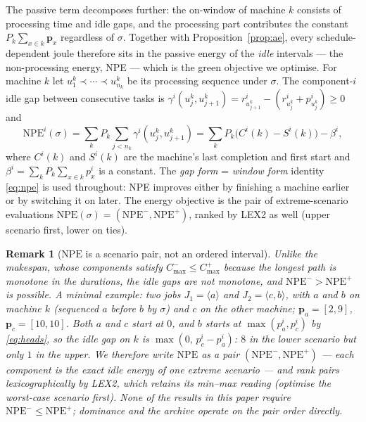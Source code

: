 \documentclass[preprint,12pt]{elsarticle}
\newtheorem{remark}{Remark}
\newcommand{\NPE}{\mathrm{NPE}}
\begin{document}
The passive term decomposes further: the on-window of machine $k$ consists
of processing time and idle gaps, and the processing part contributes the
constant $P_k\sum_{x\in k}\mathbf{p}_x$ regardless of $\sigma$. Together
with Proposition~\ref{prop:ae}, every schedule-dependent joule therefore
sits in the passive energy of the \emph{idle} intervals --- the
non-processing energy, NPE --- which is the green objective we optimise.
For machine $k$
let $u^k_1\prec\cdots\prec u^k_{n_k}$ be its processing sequence under
$\sigma$. The component-$i$ idle gap between consecutive tasks is
$\gamma^i(u^k_j,u^k_{j+1})=r^i_{u^k_{j+1}}-(r^i_{u^k_j}+p^i_{u^k_j})\ge 0$
and
\begin{equation}
\NPE^i(\sigma)=\sum_{k} P_k \sum_{j<n_k}\gamma^i(u^k_j,u^k_{j+1})
=\sum_{k} P_k\bigl(C^i(k)-S^i(k)\bigr)-\beta^i,
\label{eq:npe}
\end{equation}
where $C^i(k)$ and $S^i(k)$ are the machine's last completion and first
start and $\beta^i=\sum_k P_k\sum_{x\in k}p^i_x$ is a constant. The
\emph{gap form} = \emph{window form} identity \eqref{eq:npe} is used
throughout: NPE improves either by finishing a machine earlier or by
switching it on later. The energy objective is the pair of extreme-scenario
evaluations $\mathbf{\NPE}(\sigma)=(\NPE^-,\NPE^+)$, ranked by LEX2 as well
(upper scenario first, lower on ties).

\begin{remark}[$\mathbf{\NPE}$ is a scenario pair, not an ordered interval]
\label{rem:npe-pair}
Unlike the makespan, whose components satisfy $C^-_{\max}\le C^+_{\max}$
because the longest path is monotone in the durations, the idle gaps are
\emph{not} monotone, and $\NPE^->\NPE^+$ is possible. A minimal example:
two jobs $J_1=\langle a\rangle$ and $J_2=\langle c,b\rangle$, with $a$ and
$b$ on machine $k$ (sequenced $a$ before $b$ by $\sigma$) and $c$ on the
other machine; $\mathbf{p}_a=[2,9]$, $\mathbf{p}_c=[10,10]$. Both $a$ and
$c$ start at $0$, and $b$ starts at
$\max(p^i_a,p^i_c)$ by \eqref{eq:heads}, so the idle gap on $k$ is
$\max(0,\,p^i_c-p^i_a)$: $8$ in the lower scenario but only $1$ in the
upper. We therefore write $\mathbf{\NPE}$ as a pair $(\NPE^-,\NPE^+)$ ---
each component is the exact idle energy of one extreme scenario --- and rank
pairs lexicographically by LEX2, which retains its min--max reading
(optimise the worst-case scenario first). None of the results in this paper
require $\NPE^-\le\NPE^+$; dominance and the archive operate on the pair
order directly.
\end{remark}
\end{document}
